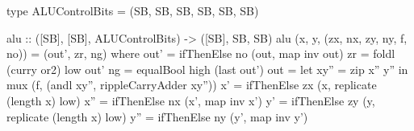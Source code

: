 \begin{haskellcode}
    type ALUControlBits = (SB, SB, SB, SB, SB, SB)

    alu :: ([SB], [SB], ALUControlBits) -> ([SB], SB, SB)
    alu (x, y, (zx, nx, zy, ny, f, no)) = (out', zr, ng)
        where
            out' = ifThenElse no (out, map inv out)
            zr   = foldl (curry or2) low out'
            ng   = equalBool high (last out')
            out  = let xy'' = zip x'' y'' in mux (f, (andl xy'', rippleCarryAdder xy''))
            x'   = ifThenElse zx (x, replicate (length x) low)
            x''  = ifThenElse nx (x', map inv x')
            y'   = ifThenElse zy (y, replicate (length x) low)
            y''  = ifThenElse ny (y', map inv y')
\end{haskellcode}
